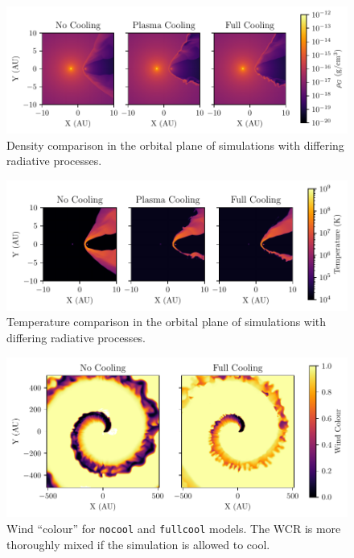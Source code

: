 \begin{figure}
  \centering
  \includegraphics{assets/results/radiative/radiative-crop-2-rho.pdf}
  \caption[Density comparison of simulations with differing radiative processes]{Density comparison  in the orbital plane of simulations with differing radiative processes.}
  \label{fig:postshockcompression}
\end{figure}

\begin{figure}
  \centering
  \includegraphics{assets/results/radiative/radiative-crop-2-temp.pdf}
  \caption[Temperature comparison of simulations with differing radiative processes]{Temperature comparison in the orbital plane of simulations with differing radiative processes.}
  \label{fig:postshocktemperature}
\end{figure}

\begin{figure}
  \centering
  \includegraphics{assets/results/radiative/radiative-r0.pdf}
  \caption[Wind mixing due to radiative methods]{Wind ``colour'' for \texttt{nocool} and \texttt{fullcool} models. The WCR is more thoroughly mixed if the simulation is allowed to cool.}
  \label{fig:radiative-windmixing}
\end{figure}

